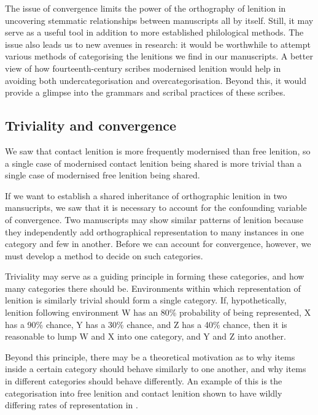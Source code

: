 The issue of convergence  limits the power of the orthography of lenition in uncovering stemmatic relationships between manuscripts all by itself. Still, it may serve as a useful tool in addition to more established philological methods. The issue also leads us to new avenues in research: it would be worthwhile to attempt various methods of categorising the lenitions we find in our manuscripts. A better view of how fourteenth-century scribes modernised lenition would help in avoiding both undercategorisation and overcategorisation. Beyond this, it would provide a glimpse into the grammars and scribal practices of these scribes.



\subsection{Triviality and convergence}
\label{sec:triv-conv}

We saw that contact lenition is more frequently modernised than free lenition, so a single case of modernised contact lenition being shared is more trivial than a single case of modernised free lenition being shared. 

If we want to establish a shared inheritance of orthographic lenition in two mansucripts, we saw that it is necessary to account for the confounding variable of convergence. Two manuscripts may show similar patterns of lenition because they independently add orthographical representation to many instances in one category and few in another. Before we can account for convergence, however, we must develop a method to decide on such categories.

Triviality may serve as a guiding principle in forming these categories, and how many categories there should be. Environments within which representation of lenition is similarly trivial should form a single category. If, hypothetically, lenition following environment W has an 80\% probability of being represented, X has a 90\% chance, Y has a 30\% chance, and Z has a 40\% chance, then it is reasonable to lump W and X into one category, and Y and Z into another.

Beyond this principle, there may be a theoretical motivation as to why items inside a certain category should behave similarly to one another, and why items in different categories should behave differently. An example of this is the categorisation into free lenition and contact lenition shown to have wildly differing rates of representation in .


